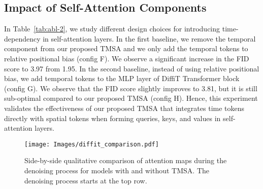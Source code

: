 \begin{table}
\centering
{}
    \caption{The impact of TMSA design choices on FID score.}
    \label{tab:abl-2}
\end{table}



\subsection{Impact of Self-Attention Components}
\label{sec:abl-temporal}
In Table~\ref{tab:abl-2}, we study different design choices for introducing time-dependency in self-attention layers. In the first baseline, we remove the temporal component from our proposed TMSA and we only add the temporal tokens to relative positional bias (config F). We observe a significant increase in the FID score to 3.97 from 1.95. In the second baseline, instead of using relative positional bias, we add temporal tokens to the MLP layer of DiffiT Transformer block (config G). We observe that the FID score slightly improves to 3.81, but it is still sub-optimal compared to our proposed TMSA (config H). Hence, this experiment validates the effectiveness of our proposed TMSA that integrates time tokens directly with spatial tokens when forming queries, keys, and values in self-attention layers.   


\begin{figure}
\centering\texttt{[image: Images/diffit\_comparison.pdf]}
\caption{Side-by-side qualitative comparison of attention maps during the denoising process for models with and without TMSA. The denoising process starts at the top row. }\label{fig:self-attn-evol}
\end{figure}










